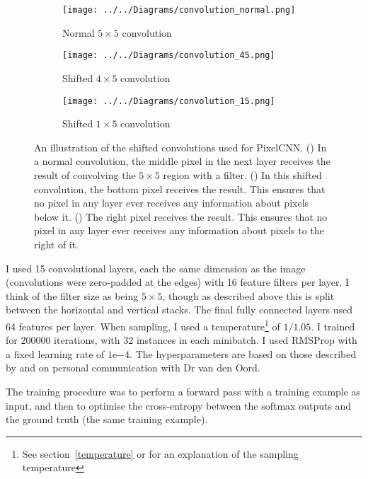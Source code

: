 \documentclass[11pt, a4paper, openany]{book}
\begin{document}
\begin{figure}
  \centering
    \begin{subfigure}{0.3\columnwidth}
        \centering
        \caption{Normal $5\times 5$ convolution}
        \texttt{[image: ../../Diagrams/convolution\_normal.png]} 
        \label{convolutions:normal}
    \end{subfigure}
    \hfill
    \begin{subfigure}{0.3\columnwidth}
        \centering
        \caption{Shifted $4\times 5$ convolution}
        \texttt{[image: ../../Diagrams/convolution\_45.png]} 
        \label{convolutions:45}
    \end{subfigure}
    \hfill
    \begin{subfigure}{0.3\columnwidth}
        \centering
        \caption{Shifted $1\times 5$ convolution}
        \texttt{[image: ../../Diagrams/convolution\_15.png]} 
        \label{convolutions:15}
    \end{subfigure}
  \caption[Shifted convolutions]{An illustration of the shifted convolutions used for PixelCNN. () In a normal convolution, the middle pixel in the next layer receives the result of convolving the $5\times 5$ region with a filter. () In this shifted convolution, the bottom pixel receives the result. This ensures that no pixel in any layer ever receives any information about pixels below it. () The right pixel receives the result. This ensures that no pixel in any layer ever receives any information about pixels to the right of it.}
  \label{convolutions}
\end{figure}

I used 15 convolutional layers, each the same dimension as the image (convolutions were zero-padded at the edges) with 16 feature filters per layer. I think of the filter size as being $5\times 5$, though as described above this is split between the horizontal and vertical stacks. The final fully connected layers used 64 features per layer. When sampling, I used a temperature\footnote{See section~\ref{temperature} or \citet{pixelcnn2} for an explanation of the sampling temperature} of $1/1.05$. I trained for 200000 iterations, with 32 instances in each minibatch. I used RMSProp with a fixed learning rate of $1\mathrm{e}{-4}$. The hyperparameters are based on those described by \citet{quantile} and on personal communication with Dr van den Oord.

The training procedure was to perform a forward pass with a training example as input, and then to optimise the cross-entropy between the softmax outputs and the ground truth (the same training example).
\end{document}
